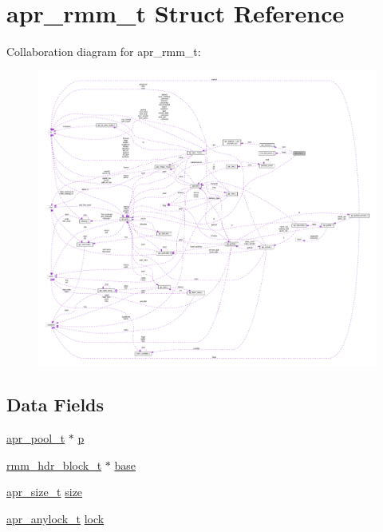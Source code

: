 \hypertarget{structapr__rmm__t}{}\section{apr\+\_\+rmm\+\_\+t Struct Reference}
\label{structapr__rmm__t}


Collaboration diagram for apr\+\_\+rmm\+\_\+t\+:
\nopagebreak
\begin{figure}[H]
\begin{center}
\leavevmode
\includegraphics[width=350pt]{structapr__rmm__t__coll__graph}
\end{center}
\end{figure}
\subsection*{Data Fields}
\begin{DoxyCompactItemize}
\item 
\hyperlink{structapr__pool__t}{apr\+\_\+pool\+\_\+t} $\ast$ \hyperlink{structapr__rmm__t_a59ee53b889389c4108b9cc5138920bb4}{p}
\item 
\hyperlink{structrmm__hdr__block__t}{rmm\+\_\+hdr\+\_\+block\+\_\+t} $\ast$ \hyperlink{structapr__rmm__t_a28016cd2f4134f761b84b24f26e33c8c}{base}
\item 
\hyperlink{group__apr__platform_gaaa72b2253f6f3032cefea5712a27540e}{apr\+\_\+size\+\_\+t} \hyperlink{structapr__rmm__t_a1849cd58933be54944b0881de95f99e4}{size}
\item 
\hyperlink{structapr__anylock__t}{apr\+\_\+anylock\+\_\+t} \hyperlink{structapr__rmm__t_a7767aedf2151e1c0f80aa24048456e7d}{lock}
\end{DoxyCompactItemize}


